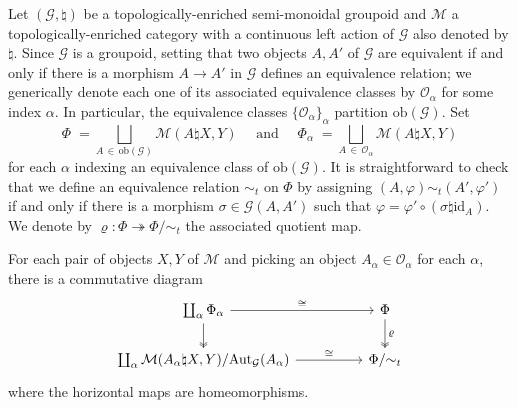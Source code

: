 \documentclass[AHL,Unicode,published]{cedram}
\newcommand{\Aut}{\mathrm{Aut}}
\newcommand{\obj}{\ensuremath{\mathrm{ob}}}
\newcommand{\id}{\mathrm{id}}
\newcommand{\cG}{\mathcal{G}}
\newcommand{\cM}{\mathcal{M}}
\newcommand{\cO}{\mathcal{O}}
\begin{document}
Let $(\cG,\natural)$ be a topologically-enriched semi-monoidal groupoid and $\cM$ a topologica\-lly-enriched category with a continuous left action of $\cG$ also denoted by $\natural$. Since $\cG$ is a groupoid, setting that two objects $A,A'$ of $\cG$ are equivalent if and only if there is a morphism $A \to A'$ in $\cG$ defines an equivalence relation; we generically denote each one of its associated equivalence classes by $\cO_{\alpha}$ for some index $\alpha$. In particular, the equivalence classes $\{\cO_{\alpha}\}_{\alpha}$ partition $\obj(\cG)$. Set
\[
\Phi \;=\!\! \bigsqcup_{A\,\in\,\obj(\cG)} \cM(A \natural X,Y) \quad\text{ and }\quad \Phi_{\alpha} \;=\! \bigsqcup_{A \,\in\,\cO_{\alpha}} \cM(A\natural X,Y)
\]
for each $\alpha$ indexing an equivalence class of $\obj(\cG)$. It is straightforward to check that we define an equivalence relation $\sim_{t}$ on $\Phi$ by assigning $(A,\varphi) \sim_{t} (A',\varphi')$ if and only if there is a morphism $\sigma \in \cG(A,A')$ such that $\varphi = \varphi' \circ (\sigma\natural\id_{A})$. We denote by $\varrho \colon \Phi \twoheadrightarrow \Phi / {\sim_{t}}$ the associated quotient map.

\begin{lemm}\label{lem:extract_proof_topological_Quillen}
For each pair of objects $X,Y$ of $\cM$ and picking an object $A_{\alpha} \in \cO_{\alpha}$ for each $\alpha$, there is a commutative diagram
\begin{equation}\label{eq:diagram_decomposition_disjoint_union}
\begin{tikzcd}
\coprod_{\alpha}\Phi_{\alpha} \ar[rr,"\cong"] \ar[d,two heads] && \Phi \ar[d,two heads,"\varrho"] \\
\coprod_{\alpha}\cM(A_{\alpha} \natural X,Y)/\Aut_{\cG}(A_{\alpha}) \ar[rr,"\cong"] && \Phi/{\sim_{t}}
\end{tikzcd}
\end{equation}
where the horizontal maps are homeomorphisms.
\end{lemm}
\end{document}
